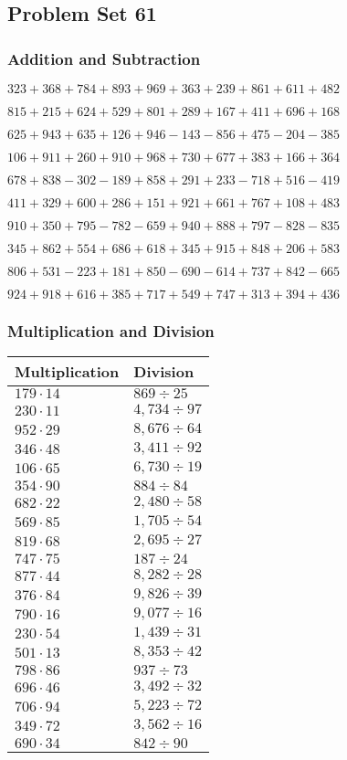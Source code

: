 \hypertarget{problem-set-61}{%
\subsection{Problem Set 61}\label{problem-set-61}}

\hypertarget{addition-and-subtraction-162}{%
\subsubsection{Addition and
Subtraction}\label{addition-and-subtraction-162}}

\(323 + 368 + 784 + 893 + 969 + 363 + 239 + 861 + 611 + 482\)

\(815 + 215 + 624 + 529 + 801 + 289 + 167 + 411 + 696 + 168\)

\(625 + 943 + 635 + 126 + 946 - 143 - 856 + 475 - 204 - 385\)

\(106 + 911 + 260 + 910 + 968 + 730 + 677 + 383 + 166 + 364\)

\(678 + 838 - 302 - 189 + 858 + 291 + 233 - 718 + 516 - 419\)

\(411 + 329 + 600 + 286 + 151 + 921 + 661 + 767 + 108 + 483\)

\(910 + 350 + 795 - 782 - 659 + 940 + 888 + 797 - 828 - 835\)

\(345 + 862 + 554 + 686 + 618 + 345 + 915 + 848 + 206 + 583\)

\(806 + 531 - 223 + 181 + 850 - 690 - 614 + 737 + 842 - 665\)

\(924 + 918 + 616 + 385 + 717 + 549 + 747 + 313 + 394 + 436\)

\hypertarget{multiplication-and-division-161}{%
\subsubsection{Multiplication and
Division}\label{multiplication-and-division-161}}

\begin{longtable}[]{@{}ll@{}}
\toprule
Multiplication & Division\tabularnewline
\midrule
\endhead
\(179 \cdot 14\) & \(869÷25\)\tabularnewline
\(230 \cdot 11\) & \(4,734÷97\)\tabularnewline
\(952 \cdot 29\) & \(8,676÷64\)\tabularnewline
\(346 \cdot 48\) & \(3,411÷92\)\tabularnewline
\(106 \cdot 65\) & \(6,730÷19\)\tabularnewline
\(354 \cdot 90\) & \(884÷84\)\tabularnewline
\(682 \cdot 22\) & \(2,480÷58\)\tabularnewline
\(569 \cdot 85\) & \(1,705÷54\)\tabularnewline
\(819 \cdot 68\) & \(2,695÷27\)\tabularnewline
\(747 \cdot 75\) & \(187÷24\)\tabularnewline
\(877 \cdot 44\) & \(8,282÷28\)\tabularnewline
\(376 \cdot 84\) & \(9,826÷39\)\tabularnewline
\(790 \cdot 16\) & \(9,077÷16\)\tabularnewline
\(230 \cdot 54\) & \(1,439÷31\)\tabularnewline
\(501 \cdot 13\) & \(8,353÷42\)\tabularnewline
\(798 \cdot 86\) & \(937÷73\)\tabularnewline
\(696 \cdot 46\) & \(3,492÷32\)\tabularnewline
\(706 \cdot 94\) & \(5,223÷72\)\tabularnewline
\(349 \cdot 72\) & \(3,562÷16\)\tabularnewline
\(690 \cdot 34\) & \(842÷90\)\tabularnewline
\bottomrule
\end{longtable}

